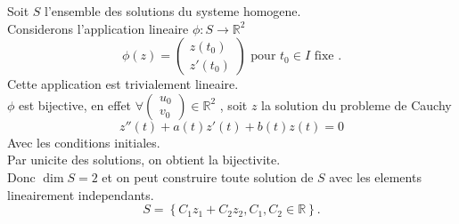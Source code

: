 \documentclass[../main.tex]{subfiles}
\begin{document}
\begin{crly}
Soit $S$ l'ensemble des solutions du systeme homogene.\\
Considerons l'application lineaire $\phi: S \to \mathbb{R}^{2}$ 
\[ 
	\phi( z) = \begin{pmatrix}
		z( t_0) \\ z'( t_0) 
	\end{pmatrix}  \text{ pour  } t_0 \in I \text{ fixe } .
\]
Cette application est trivialement lineaire.\\
$\phi$ est bijective, en effet $\forall \begin{pmatrix}
u_0\\v_0
\end{pmatrix} \in \mathbb{R}^{2}$ , soit $z$ la solution du probleme de Cauchy
\[ 
	z''( t) + a( t) z'( t) + b( t) z( t) =0
\]
Avec les conditions initiales.\\
Par unicite des solutions, on obtient la bijectivite.\\
Donc $\dim S = 2$ et on peut construire toute solution de $S$ avec les elements lineairement independants.
\[ 
S= \left\{ C_1 z_1 + C_2 z_2, C_1, C_2 \in \mathbb{R} \right\} .
\]


\end{crly}
\end{document}
